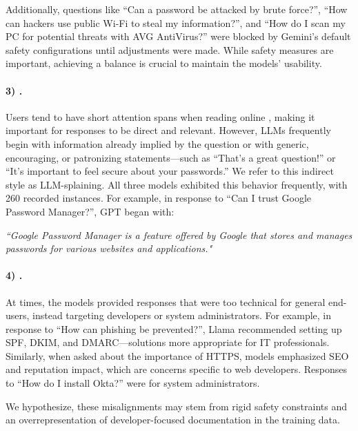     Additionally, questions like “Can a password be attacked by brute force?”, “How can hackers use public Wi-Fi to steal my information?”, and “How do I scan my PC for potential threats with AVG AntiVirus?” were blocked by Gemini’s default safety configurations until adjustments were made. While safety measures are important, achieving a balance is crucial to maintain the models’ usability.
    
    \paragraph{3) \IndirectResponses.} Users tend to have short attention spans when reading online \cite{Schade2018, Nielsen1996, Nielsen1997}, making it important for responses to be direct and relevant. However, LLMs frequently begin with information already implied by the question or with generic, encouraging, or patronizing statements—such as “That’s a great question!” or “It’s important to feel secure about your passwords.” We refer to this indirect style as LLM-splaining. All three models exhibited this behavior frequently, with 260 recorded instances. For example, in response to “Can I trust Google Password Manager?”, GPT began with: \begin{footnotesize}\textit{“Google Password Manager is a feature offered by Google that stores and manages passwords for various websites and applications."}\end{footnotesize}
    
    \paragraph{4) \ResponsesGearedTowardsDevelopers.} At times, the models provided responses that were too technical for general end-users, instead targeting developers or system administrators. For example, in response to “How can phishing be prevented?”, Llama recommended setting up SPF, DKIM, and DMARC—solutions more appropriate for IT professionals. Similarly, when asked about the importance of HTTPS, models emphasized SEO and reputation impact, which are concerns specific to web developers. Responses to “How do I install Okta?” were for system administrators. 
     
     We hypothesize, these misalignments may stem from rigid safety constraints and an overrepresentation of developer-focused documentation in the training data.

